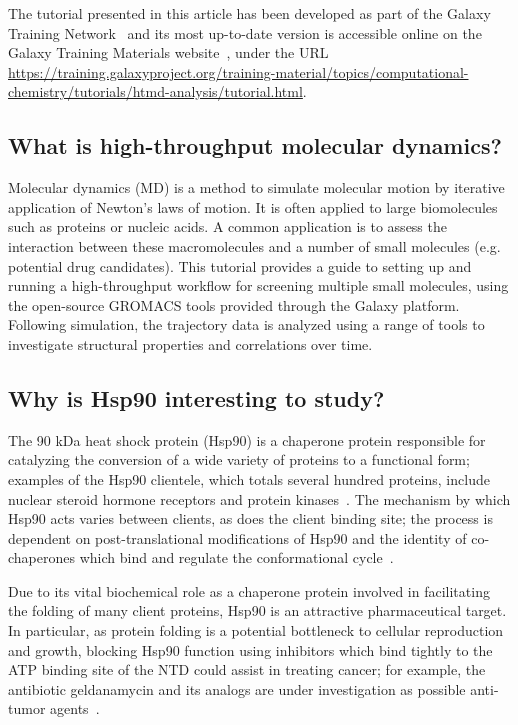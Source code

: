 \documentclass[twocolumn]{bmcart}%
\begin{document}
The tutorial presented in this article has been developed as part of the Galaxy Training Network~\cite{Batut2018} and its most up-to-date version is accessible online on the Galaxy Training Materials website~\cite{gtn_comp}, under the URL \url{https://training.galaxyproject.org/training-material/topics/computational-chemistry/tutorials/htmd-analysis/tutorial.html}.

\subsection*{What is high-throughput molecular
dynamics?}\label{what-is-high-throughput-molecular-dynamics}

Molecular dynamics (MD) is a method to simulate molecular motion by
iterative application of Newton's laws of motion. It is often applied to
large biomolecules such as proteins or nucleic acids. A common
application is to assess the interaction between these macromolecules
and a number of small molecules (e.g. potential drug candidates). This
tutorial provides a guide to setting up and running a high-throughput
workflow for screening multiple small molecules, using the open-source
GROMACS tools provided through the Galaxy platform. Following simulation, the trajectory data is analyzed using a range of tools to investigate structural properties and correlations over time.


\subsection*{Why is Hsp90 interesting to
study?}\label{why-is-hsp90-interesting-to-study}

The 90 kDa heat shock protein (Hsp90) is a chaperone protein responsible
for catalyzing the conversion of a wide variety of proteins to a
functional form; examples of the Hsp90 clientele, which totals several
hundred proteins, include nuclear steroid hormone receptors and protein
kinases~\cite{Pearl2006}. The mechanism by which Hsp90 acts varies between clients, as
does the client binding site; the process is dependent on
post-translational modifications of Hsp90 and the identity of
co-chaperones which bind and regulate the conformational cycle~\cite{Schopf2017}.

Due to its vital biochemical role as a chaperone protein involved in
facilitating the folding of many client proteins, Hsp90 is an attractive
pharmaceutical target. In particular, as protein folding is a potential
bottleneck to cellular reproduction and growth, blocking Hsp90
function using inhibitors which bind tightly to the ATP binding site of the NTD
could assist in treating cancer; for example, the antibiotic
geldanamycin and its analogs are under investigation as possible
anti-tumor agents~\cite{Stebbins1997,Hermane2019}.
\end{document}
